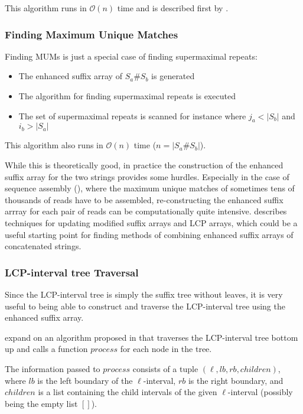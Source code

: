 \documentclass[a4paper,10pt]{article}
\begin{document}
This algorithm runs in $\mathcal{O}(n)$ time and is described first by
\citealt{abouelhoda2002enhanced}.

\subsubsection*{Finding Maximum Unique Matches}

Finding MUMs is just a special case of finding supermaximal repeats:

\begin{itemize}
\item The enhanced suffix array of $S_a\#S_b$ is generated
\item The algorithm for finding supermaximal repeats is executed
\item The set of supermaximal repeats is scanned for instance where $j_a<|S_b|$ and $i_b>|S_a|$
\end{itemize}

This algorithm also runs in $\mathcal{O}(n)$ time ($n=|S_a\#S_b|$).

While this is theoretically good, in practice the construction
of the enhanced suffix array for the two strings provides
some hurdles. Especially in the case of sequence assembly
(\citealt{myers2000whole}), where the maximum unique matches of sometimes
tens of thousands of reads have to be assembled, re-constructing the
enhanced suffix arrray for each pair of reads can be computationally
quite intensive. \citealt{salson2010dynamic} describes techniques for
updating modified suffix arrays and LCP arrays, which could be a useful
starting point for finding methods of combining enhanced suffix arrays
of concatenated strings.

\subsubsection*{LCP-interval tree Traversal}

Since the LCP-interval tree is simply the suffix tree without leaves, it
is very useful to being able to construct and traverse the LCP-interval
tree using the enhanced suffix array.

\citealt{abouelhoda2002enhanced} expand on an algorithm proposed in
\citealt{kasai2001linear} that traverses the LCP-interval tree bottom
up and calls a function $process$ for each node in the tree.

The information passed to $process$ consists of a tuple $(\ell, lb, rb,
children)$, where $lb$ is the left boundary of the $\ell$-interval,
$rb$ is the right boundary, and $children$ is a list containing the
child intervals of the given $\ell$-interval (possibly being the empty
list $[]$).
\end{document}
